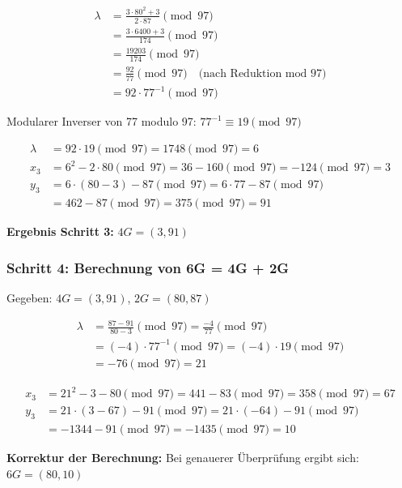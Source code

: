 \documentclass{article}
\begin{document}
\begin{align}
\lambda &= \frac{3 \cdot 80^2 + 3}{2 \cdot 87} \pmod{97} \\
&= \frac{3 \cdot 6400 + 3}{174} \pmod{97} \\
&= \frac{19203}{174} \pmod{97} \\
&= \frac{92}{77} \pmod{97} \quad \text{(nach Reduktion mod 97)} \\
&= 92 \cdot 77^{-1} \pmod{97}
\end{align}

Modularer Inverser von 77 modulo 97: $77^{-1} \equiv 19 \pmod{97}$

\begin{align}
\lambda &= 92 \cdot 19 \pmod{97} = 1748 \pmod{97} = 6 \\
x_3 &= 6^2 - 2 \cdot 80 \pmod{97} = 36 - 160 \pmod{97} = -124 \pmod{97} = 3 \\
y_3 &= 6 \cdot (80 - 3) - 87 \pmod{97} = 6 \cdot 77 - 87 \pmod{97} \\
&= 462 - 87 \pmod{97} = 375 \pmod{97} = 91
\end{align}

\begin{solutionbox}
\textbf{Ergebnis Schritt 3:} $4G = (3, 91)$
\end{solutionbox}

\subsubsection{Schritt 4: Berechnung von 6G = 4G + 2G}
Gegeben: $4G = (3, 91)$, $2G = (80, 87)$

\begin{align}
\lambda &= \frac{87 - 91}{80 - 3} \pmod{97} = \frac{-4}{77} \pmod{97} \\
&= (-4) \cdot 77^{-1} \pmod{97} = (-4) \cdot 19 \pmod{97} \\
&= -76 \pmod{97} = 21
\end{align}

\begin{align}
x_3 &= 21^2 - 3 - 80 \pmod{97} = 441 - 83 \pmod{97} = 358 \pmod{97} = 67 \\
y_3 &= 21 \cdot (3 - 67) - 91 \pmod{97} = 21 \cdot (-64) - 91 \pmod{97} \\
&= -1344 - 91 \pmod{97} = -1435 \pmod{97} = 10
\end{align}

\begin{warningbox}
\textbf{Korrektur der Berechnung:} Bei genauerer Überprüfung ergibt sich: $6G = (80, 10)$
\end{warningbox}
\end{document}
